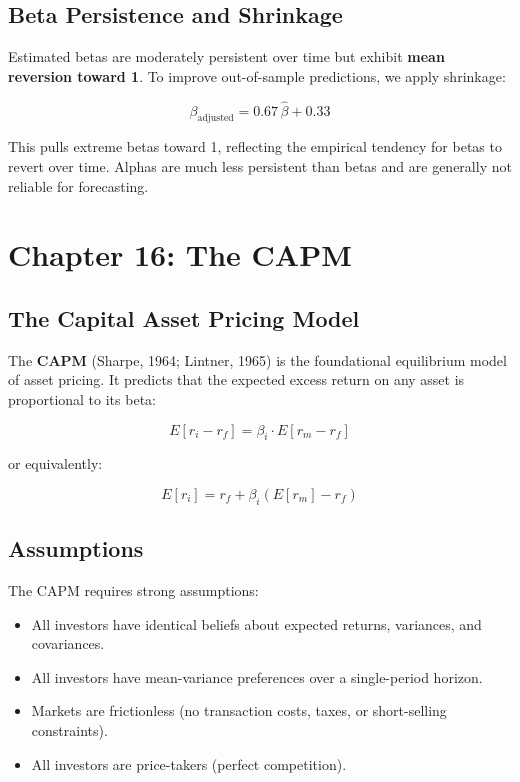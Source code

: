 \documentclass[11pt,letterpaper]{report}
\begin{document}
\section{Beta Persistence and Shrinkage}


Estimated betas are moderately persistent over time but exhibit \textbf{mean reversion toward 1}.  To improve out-of-sample predictions, we apply shrinkage:

$$\beta_{\text{adjusted}} = 0.67 \, \hat{\beta} + 0.33$$

This pulls extreme betas toward 1, reflecting the empirical tendency for betas to revert over time.  Alphas are much less persistent than betas and are generally not reliable for forecasting.


\chapter{Chapter 16: The CAPM}


\section{The Capital Asset Pricing Model}


The \textbf{CAPM} (Sharpe, 1964; Lintner, 1965) is the foundational equilibrium model of asset pricing.  It predicts that the expected excess return on any asset is proportional to its beta:

$$E[r_i - r_f] = \beta_i \cdot E[r_m - r_f]$$

or equivalently:

$$E[r_i] = r_f + \beta_i \left(E[r_m] - r_f\right)$$

\section{Assumptions}


The CAPM requires strong assumptions:

\begin{itemize}
  \item All investors have identical beliefs about expected returns, variances, and covariances.
  \item All investors have mean-variance preferences over a single-period horizon.
  \item Markets are frictionless (no transaction costs, taxes, or short-selling constraints).
  \item All investors are price-takers (perfect competition).
\end{itemize}
\end{document}
